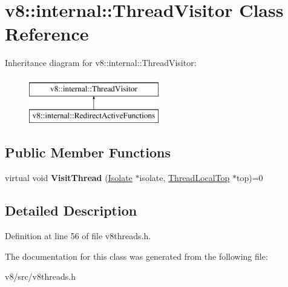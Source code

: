\hypertarget{classv8_1_1internal_1_1ThreadVisitor}{}\section{v8\+:\+:internal\+:\+:Thread\+Visitor Class Reference}
\label{classv8_1_1internal_1_1ThreadVisitor}
Inheritance diagram for v8\+:\+:internal\+:\+:Thread\+Visitor\+:\begin{figure}[H]
\begin{center}
\leavevmode
\includegraphics[height=2.000000cm]{classv8_1_1internal_1_1ThreadVisitor}
\end{center}
\end{figure}
\subsection*{Public Member Functions}
\begin{DoxyCompactItemize}
\item 
\mbox{\label{classv8_1_1internal_1_1ThreadVisitor_a1be34c6a86e87d00a507c5b7bf0652fe}} 
virtual void {\bfseries Visit\+Thread} (\mbox{\hyperlink{classv8_1_1internal_1_1Isolate}{Isolate}} $\ast$isolate, \mbox{\hyperlink{classv8_1_1internal_1_1ThreadLocalTop}{Thread\+Local\+Top}} $\ast$top)=0
\end{DoxyCompactItemize}


\subsection{Detailed Description}


Definition at line 56 of file v8threads.\+h.



The documentation for this class was generated from the following file\+:\begin{DoxyCompactItemize}
\item 
v8/src/v8threads.\+h\end{DoxyCompactItemize}
